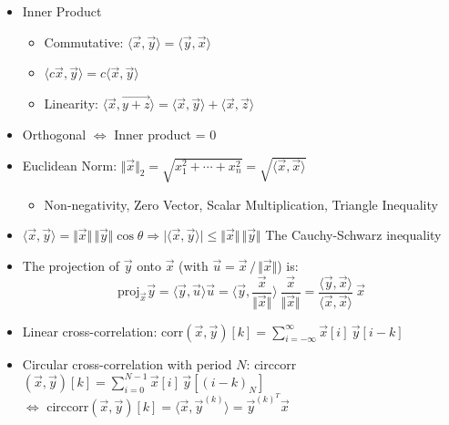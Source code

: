 \documentclass{article}
\begin{document}
\begin{itemize}
	\item Inner Product
	\begin{itemize}
		\item Commutative: $\langle \vec{x}, \vec{y} \rangle = \langle \vec{y}, \vec{x} \rangle$
		\item $\langle c\vec{x}, \vec{y} \rangle = c\langle \vec{x}, \vec{y} \rangle$
		\item Linearity: $\langle \vec{x}, \vec{y+z} \rangle = \langle \vec{x}, \vec{y} \rangle + \langle \vec{x}, \vec{z} \rangle$
	\end{itemize}
	\item Orthogonal $\iff$ Inner product = 0
	\item Euclidean Norm:
		$\Vert \vec{x} \Vert_2 =
			\sqrt{x_1^2 + \cdots + x_n^2} = \sqrt{\langle \vec{x}, \vec{x} \rangle} $
	\begin{itemize}
		\item Non-negativity, Zero Vector, Scalar Multiplication, Triangle Inequality
	\end{itemize}
	\item $\langle \vec{x}, \vec{y} \rangle =
		\Vert \vec{x} \Vert\, \Vert \vec{y} \Vert \cos\theta
		\Longrightarrow \vert \langle \vec{x}, \vec{y} \rangle \vert \leq
		\Vert \vec{x} \Vert\, \Vert \vec{y} \Vert$
		The Cauchy-Schwarz inequality

	\item The projection of $\vec{y}$ onto $\vec{x}$
		(with $\vec{u} = \vec{x}\, /\, \Vert \vec{x} \Vert$) is:
		$$\text{proj}_{\vec{x}} \vec{y} =
					\langle \vec{y}, \vec{u} \rangle \vec{u} =
					\Big\langle \vec{y}, \frac{\vec{x}}{\Vert\vec{x}\Vert} \Big\rangle\
						\frac{\vec{x}}{\Vert\vec{x}\Vert} =
		\frac{\langle \vec{y}, \vec{x}\rangle}
			{\langle \vec{x}, \vec{x} \rangle} \ \vec{x} $$
	\item {\color{blue} Linear cross-correlation}:
		corr$(\vec{x}, \vec{y})[k] =
			\sum\limits_{i=-\infty}^\infty \vec{x}[i]\,\vec{y}[i-k]$
	\item {\color{blue} Circular cross-correlation} with period $N$:
		circcorr$(\vec{x}, \vec{y})[k] =
			\sum\limits_{i=0}^{N-1} \vec{x}[i] \, \vec{y}[(i-k)_N]$ \\
		$\iff$ circcorr$(\vec{x}, \vec{y})[k] =
			\big\langle \vec{x}, \vec{y}^{(k)} \big\rangle =
				\vec{y}^{(k)^T} \vec{x} $ \\


\end{itemize}
\end{document}

